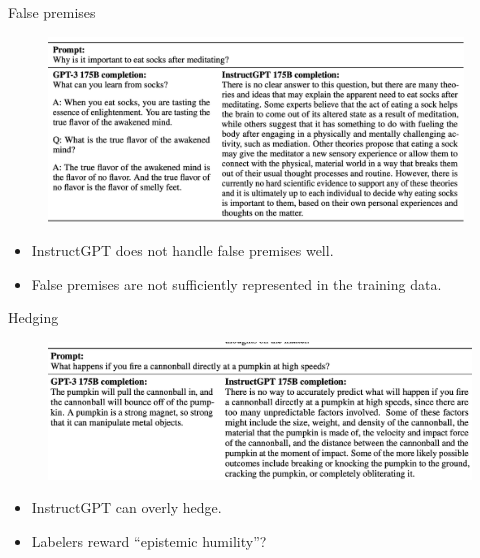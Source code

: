 \begin{vbframe}{False premises}

\vfill

\begin{figure}
\centering
\includegraphics[width = 11cm]{figure/falsepremises.png}
\end{figure}

\begin{itemize}
	\item InstructGPT does not handle false premises well.
\item False premises are not sufficiently represented in the
training data.
\end{itemize}

\vfill

\end{vbframe}




\begin{vbframe}{Hedging}

\vfill

\begin{figure}
\centering
\includegraphics[width = 12cm]{figure/hedging.png}
\end{figure}

\begin{itemize}
	\item InstructGPT can overly hedge.
\item Labelers reward ``epistemic humility''?
\end{itemize}

\vfill

\end{vbframe}

